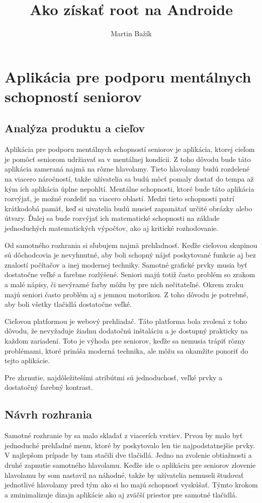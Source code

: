 \documentclass[a4paper,11pt]{report}
\author{Martin Bažík}
\title{Ako získať root na Androide}
\begin{document}
\section*{Aplikácia pre podporu mentálnych schopností seniorov}
\subsection*{Analýza produktu a cieľov}
Aplikácia pre podporu mentálnych schopností seniorov je aplikácia, ktorej cieľom je pomôcť seniorom udržiavať sa v mentálnej kondícii. Z toho dôvodu bude táto aplikácia zameraná najmä na rôzne hlavolamy. Tieto hlavolamy budú rozdelené na viacero náročností, takže užívatelia sa budú môcť pomaly dostať do tempa až kým ich aplikácia úplne nepohltí. Mentálne schopnosti, ktoré bude táto aplikácia rozvýjať, je možné rozdeliť na viacero oblastí. Medzi tieto schopnosti patrí krátkodobá pamäť, keď si uivatelia budú musieť zapamätať určité obrázky alebo útvary. Ďalej sa bude rozvýjať ich matematické schopnosti na základe jednoduchých matematických výpočtov, ako aj kritické rozhodovanie. 

Od samotného rozhrania si sľubujem najmä prehľadnosť. Keďže cieľovou skupinou sú dôchodcovia je nevyhnutné, aby boli schopný nájsť poskytované funkcie aj bez znalostí počítačov a inej modernej techniky. Samotné grafické prvky musia byť dostatočne veľké a farebne rozlýšené. Seniori majú totiž často problém so zrakom a malé nápisy, či nevýrazné farby môžu by pre nich nečitateľné. Okrem zraku majú seniori často problém aj s jemnou motorikou. Z toho dôvodu je potrebné, aby boli všetky tlačidlá dostatočne veľké.

Cieľovou platformou je webový prehliadač. Táto platforma bola zvolená z toho dôvodu, že nevyžaduje žiadnu dodatočnú inštaláciu a je dostupný prakticky na každom zariadení. Toto je výhoda pre seniorov, keďže sa nemusia trápiť rôzny problémami, ktoré prináša moderná technika, ale môžu sa okamžite ponoriť do tejto aplikácie.

Pre zhrnutie, najdôležitešími atribútmi sú jednoduchosť, veľké prvky a dostatočný farebný kontrast.

\subsection*{Návrh rozhrania}
Samotné rozhranie by sa malo skladať z viacerích vrstiev. Prvou by malo byť jednoduché prehľadné menu, ktoré by poskytovalo len tie najpodstatnejšie prvky. V najlepšom prípade by tam stačili dve tlačidlá. Jedno na zvolenie obtiažnosti a druhé zapnutie samotného hlavolamu. Keďže ide o aplikáciu pre seniorov zlovenie hlavolamu by som nastavil na náhodné, takže by užívatelia nemuseli študovať jednotlivé hlavolamy pred tým ako si ho majú schopnosť vyskúšať. Týmto krokom a zminimalizuje dizajn aplikácie ako aj zväčší priestor pre samotné tlačidlá. 
\end{document}
